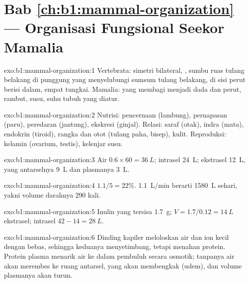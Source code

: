 \section*{Bab \ref{ch:b1:mammal-organization} --- Organisasi Fungsional Seekor Mamalia}

\begin{solution}{exo:b1:mammal-organization:1}
Vertebrata: simetri bilateral, , sumbu ruas tulang belakang
di punggung yang menyelubungi sumsum tulang belakang,  di sisi
perut berisi  dalam, empat tungkai. Mamalia:  yang membagi
 menjadi dada dan perut, rambut, susu, suhu tubuh yang diatur.
\end{solution}

\begin{solution}{exo:b1:mammal-organization:2}
Nutrisi: pencernaan (lambung), pernapasan (paru), peredaran (jantung),
ekskresi (ginjal). Relasi: saraf (otak), indra (mata), endokrin
(tiroid), rangka dan otot (tulang paha, bisep), kulit. Reproduksi:
kelamin (ovarium, testis), kelenjar susu.
\end{solution}

\begin{solution}{exo:b1:mammal-organization:3}
Air $0.6\times 60 = \qty{36}{L}$; intrasel \qty{24}{L}; ekstrasel
\qty{12}{L}, yang antarselnya \qty{9}{L} dan plasmanya
\qty{3}{L}.
\end{solution}

\begin{solution}{exo:b1:mammal-organization:4}
$1.1/5 = 22\%$. \qty{1.1}{L/min} berarti \qty{1580}{L} sehari, yakni
volume darahnya 290 kali.
\end{solution}

\begin{solution}{exo:b1:mammal-organization:5}
Inulin yang tersisa \qty{1.7}{g}; $V = 1.7/0.12 = \qty{14}{L}$
ekstrasel; intrasel $42 - 14 = \qty{28}{L}$.
\end{solution}

\begin{solution}{exo:b1:mammal-organization:6}
Dinding kapiler meloloskan air dan ion kecil dengan bebas, sehingga
keduanya menyetimbang, tetapi menahan protein. Protein plasma menarik
air ke dalam pembuluh secara osmotik; tanpanya air akan merembes ke
ruang antarsel, yang akan membengkak (udem), dan volume plasmanya akan
turun.
\end{solution}

